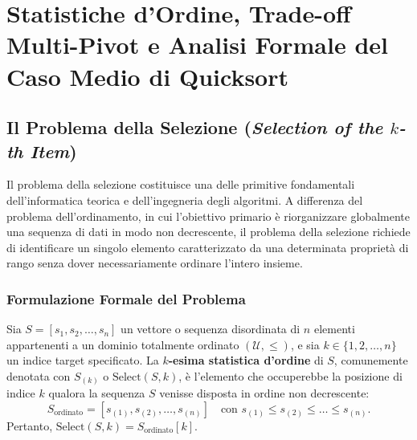 \chapter{Statistiche d'Ordine, Trade-off Multi-Pivot e Analisi Formale del Caso Medio di Quicksort}
\label{cha:lecture-six}

\FloatBarrier
\section{Il Problema della Selezione (\textit{Selection of the \texorpdfstring{$k$}{k}-th Item})}
\label{sec:selection-problem}

Il problema della selezione costituisce una delle primitive fondamentali dell'informatica teorica e dell'ingegneria degli algoritmi. A differenza del problema dell'ordinamento, in cui l'obiettivo primario è riorganizzare globalmente una sequenza di dati in modo non decrescente, il problema della selezione richiede di identificare un singolo elemento caratterizzato da una determinata proprietà di rango senza dover necessariamente ordinare l'intero insieme.
\FloatBarrier

\subsection{Formulazione Formale del Problema}
\label{subsec:selection-formulation}

\begin{definition}
Sia $S = [s_1, s_2, \dots, s_n]$ un vettore o sequenza disordinata di $n$ elementi appartenenti a un dominio totalmente ordinato $(\mathcal{U}, \le)$, e sia $k \in \{1, 2, \dots, n\}$ un indice target specificato. La \textbf{$k$-esima statistica d'ordine} di $S$, comunemente denotata con $S_{(k)}$ o $\text{Select}(S, k)$, è l'elemento che occuperebbe la posizione di indice $k$ qualora la sequenza $S$ venisse disposta in ordine non decrescente:
\begin{equation}
  S_{\text{ordinato}} = [s_{(1)}, s_{(2)}, \dots, s_{(n)}] \quad \text{con } s_{(1)} \le s_{(2)} \le \dots \le s_{(n)}.
\end{equation}
Pertanto, $\text{Select}(S, k) = S_{\text{ordinato}}[k]$.
\end{definition}

